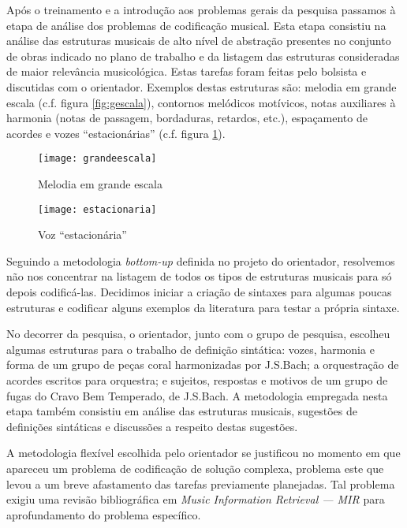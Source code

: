 \documentclass[11pt]{article}
\newcommand{\eng}[1]{\textit{#1}}
\begin{document}
Após o treinamento e a introdução aos problemas gerais da pesquisa
passamos à etapa de análise dos problemas de codificação musical.
Esta etapa consistiu na análise das estruturas musicais de alto nível
de abstração presentes no conjunto de obras indicado no plano de
trabalho e da listagem das estruturas consideradas de maior relevância
musicológica. Estas tarefas foram feitas pelo bolsista e discutidas
com o orientador. Exemplos destas estruturas são: melodia em grande
escala (c.f. figura \ref{fig:gescala}), contornos melódicos motívicos,
notas auxiliares à harmonia (notas de passagem, bordaduras, retardos,
etc.), espaçamento de acordes e vozes ``estacionárias'' (c.f. figura
\ref{fig:estacionaria}).

\begin{figure}
\begin{minipage}[t]{6.5cm}
 \centering
  \texttt{[image: grandeescala]}
 \caption{Melodia em grande escala}
 \label{fig:gescala}
\end{minipage}
\hfill
\begin{minipage}[t]{6.5cm}
 \centering
 \texttt{[image: estacionaria]}
\caption{Voz ``estacionária''}
\label{fig:estacionaria}
\end{minipage}
\hfill
\end{figure}

Seguindo a metodologia \eng{bottom-up} definida no projeto do
orientador, resolvemos não nos concentrar na listagem de todos os
tipos de estruturas musicais para só depois codificá-las. Decidimos
iniciar a criação de sintaxes para algumas poucas estruturas e
codificar alguns exemplos da literatura para testar a própria
sintaxe.

No decorrer da pesquisa, o orientador, junto com o grupo de pesquisa,
escolheu algumas estruturas para o trabalho de definição sintática:
vozes, harmonia e forma de um grupo de peças coral harmonizadas por
J.S.Bach; a orquestração de acordes escritos para orquestra; e
sujeitos, respostas e motivos de um grupo de fugas do Cravo Bem
Temperado, de J.S.Bach. A metodologia empregada nesta etapa também
consistiu em análise das estruturas musicais, sugestões de definições
sintáticas e discussões a respeito destas sugestões.

A metodologia flexível escolhida pelo orientador se justificou no
momento em que apareceu um problema de codificação de solução
complexa, problema este que levou a um breve afastamento das tarefas
previamente planejadas. Tal problema exigiu uma revisão bibliográfica
em \eng{Music Information Retrieval --- MIR} para aprofundamento do
problema específico.
\end{document}
